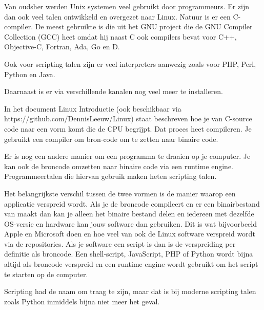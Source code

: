 Van oudsher werden Unix systemen veel gebruikt door programmeurs. Er zijn dan ook veel talen ontwikkeld en overgezet naar Linux. Natuur is er een C-compiler. De meest gebruikte is die uit het GNU project die de GNU Compiler Collection (GCC) heet omdat hij naast C ook compilers bevat voor C++, Objective-C, Fortran, Ada, Go en D.

Ook voor scripting talen zijn er veel \foreignlanguage{english}{interpreters} aanwezig zoals voor PHP, Perl, Python en Java.

Daarnaast is er via verschillende kanalen nog veel meer te installeren.

In het document Linux Introductie (ook beschikbaar via https://github.com/DennisLeeuw/Linux) staat beschreven hoe je van C-source code naar een vorm komt die de CPU begrijpt. Dat proces heet compileren. Je gebruikt een compiler om bron-code om te zetten naar binaire code.

Er is nog een andere manier om een programma te draaien op je computer. Je kan ook de broncode omzetten naar binaire code via een runtime engine. Programmeertalen die hiervan gebruik maken heten scripting talen.

Het belangrijkste verschil tussen de twee vormen is de manier waarop een applicatie verspreid wordt. Als je de broncode compileert en er een binairbestand van maakt dan kan je alleen het binaire bestand delen en iedereen met dezelfde OS-versie en hardware kan jouw software dan gebruiken. Dit is wat bijvoorbeeld Apple en Microsoft doen en hoe veel van ook de Linux software verspreid wordt via de repositories. Als je software een script is dan is de verspreiding per definitie als broncode. Een shell-script, JavaScript, PHP of Python wordt bijna altijd als broncode verspreid en een runtime engine wordt gebruikt om het script te starten op de computer.

Scripting had de naam om traag te zijn, maar dat is bij moderne scripting talen zoals Python inmiddels bijna niet meer het geval.

